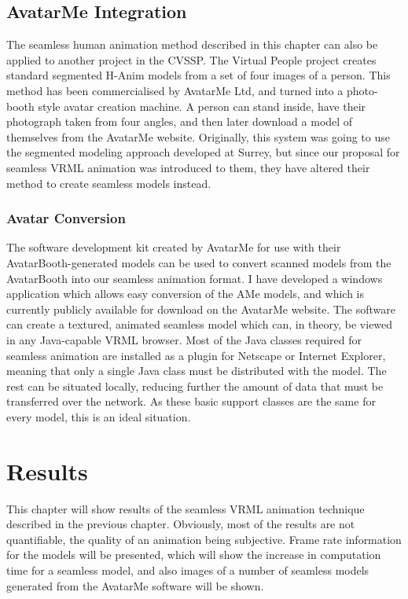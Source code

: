 \documentclass[10pt,oneside,fleqn,a4paper]{book}
\begin{document}
\section{\label{sec:vrmlavatarme}AvatarMe Integration}
The seamless human animation method described in this chapter can also be applied to another project in the CVSSP. The Virtual People project creates standard segmented H-Anim models from a set of four images of a person. This method has been commercialised by AvatarMe Ltd, and turned into a photo-booth style avatar creation machine. A person can stand inside, have their photograph taken from four angles, and then later download a model of themselves from the AvatarMe website. Originally, this system was going to use the segmented modeling approach developed at Surrey, but since our proposal for seamless VRML animation was introduced to them, they have altered their method to create seamless models instead.

\subsection{\label{sec:vrmlavatarconvertor}Avatar Conversion}
The software development kit created by AvatarMe for use with their AvatarBooth-generated models can be used to convert scanned models from the AvatarBooth into our seamless animation format. I have developed a windows application which allows easy conversion of the AMe models, and which is currently publicly available for download on the AvatarMe website. The software can create a textured, animated seamless model which can, in theory,  be viewed in any Java-capable VRML browser. Most of the Java classes required for seamless animation are installed as a plugin for Netscape or Internet Explorer, meaning that only a single Java class must be distributed with the model. The rest can be situated locally, reducing further the amount of data that must be transferred over the network. As these basic support classes are the same for every model, this is an ideal situation.

\chapter{\label{ch:results}Results}
This chapter will show results of the seamless VRML animation technique described in the previous chapter. Obviously, most of the results are not quantifiable, the quality of an animation being subjective. Frame rate information for the models will be presented, which will show the increase in computation time for a seamless model, and also images of a number of seamless models generated from the AvatarMe software will be shown.
\end{document}

